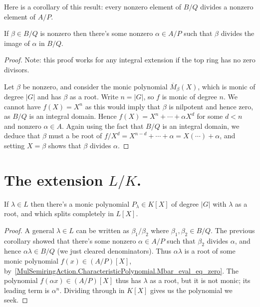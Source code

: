 Here is a corollary of this result: every nonzero element of $B/Q$ divides
a nonzero element of $A/P$.
\begin{corollary}
  \label{Algebra.exists_dvd_nonzero_if_isIntegral}
  \leanok
  If $\beta\in B/Q$ is nonzero then there's some nonzero $\alpha\in A/P$
  such that $\beta$ divides the image of $\alpha$ in $B/Q$.
\end{corollary}
\begin{proof}
  \leanok
  Note: this proof works for any
  integral extension if the top ring has no zero divisors.

  Let $\beta$ be nonzero, and
  consider the monic polynomial $\overline{M}_\beta(X)$, which is monic of
  degree $|G|$ and has $\beta$ as a root. Write $n=|G|$, so $f$ is monic
  of degree $n$. We cannot have $f(X)=X^n$ as this would imply that $\beta$ is
  nilpotent and hence zero, as $B/Q$ is an integral domain. Hence $f(X)=X^n+\cdots +\alpha X^d$
  for some $d<n$ and nonzero $\alpha\in A$. Again using the fact that $B/Q$ is an integral domain, we
  deduce that $\beta$ must a be root of $f/X^d=X^{n-d}+\cdots+\alpha=X(\cdots)+\alpha$, and setting
  $X=\beta$ shows that $\beta$ divides $\alpha$.
\end{proof}

\section{The extension \texorpdfstring{$L/K$}{L/K}.}

\begin{theorem}
  \label{Bourbaki52222.f_exists}
  If $\lambda\in L$ then there's a monic polynomial $P_\lambda\in K[X]$ of degree $|G|$
  with $\lambda$ as a root, and which splits completely in $L[X]$.
  \leanok
\end{theorem}
\begin{proof}
  \leanok
  A general $\lambda\in L$ can be written as $\beta_1/\beta_2$ where $\beta_1,\beta_2\in B/Q$.
  The previous corollary showed that there's some nonzero $\alpha\in A/P$ such that $\beta_2$
  divides $\alpha$, and hence $\alpha\lambda\in B/Q$ (we just cleared denominators).
  Thus $\alpha\lambda$ is a root of some monic polynomial $f(x)\in (A/P)[X]$,
  by~\ref{MulSemiringAction.CharacteristicPolynomial.Mbar_eval_eq_zero}.
  The polynomial $f(\alpha x)\in (A/P)[X]$ thus
  has $\lambda$ as a root, but it is not monic; its leading term is $\alpha^n$.
  Dividing through in $K[X]$ gives us the polynomial we seek.
\end{proof}

